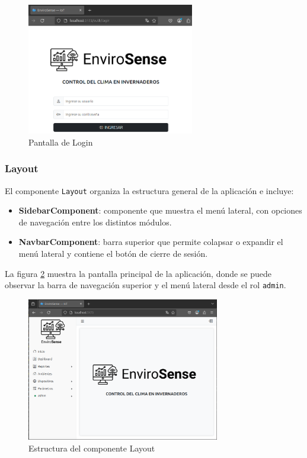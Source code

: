 \begin{figure}[H]
    \centering
    \includegraphics[width=0.65\textwidth]{./Images/24_login.png}
    \caption{Pantalla de Login}
    \label{fig:login}
\end{figure}

\subsubsection{Layout}

El componente \texttt{Layout} organiza la estructura general de la aplicación e
incluye:
\begin{itemize}
    \item \textbf{SidebarComponent}: componente que muestra el menú lateral, con
          opciones de navegación entre los distintos módulos.
    \item \textbf{NavbarComponent}: barra superior que permite colapsar o expandir
          el menú lateral y contiene el botón de cierre de sesión.
\end{itemize}

La figura \ref{fig:layout} muestra la pantalla principal de la aplicación,
donde se puede observar la barra de navegación superior y el menú lateral desde
el rol \texttt{admin}.

\begin{figure}[H]
    \centering
    \includegraphics[width=0.75\textwidth]{./Images/25_layout.png}
    \caption{Estructura del componente Layout}
    \label{fig:layout}
\end{figure}

